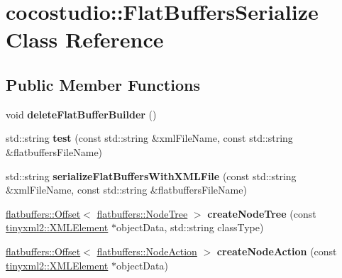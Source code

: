 \hypertarget{classcocostudio_1_1FlatBuffersSerialize}{}\section{cocostudio\+:\+:Flat\+Buffers\+Serialize Class Reference}
\label{classcocostudio_1_1FlatBuffersSerialize}
\subsection*{Public Member Functions}
\begin{DoxyCompactItemize}
\item 
\mbox{\label{classcocostudio_1_1FlatBuffersSerialize_aa6bc2091bd7c2b5c388d763331cca338}} 
void {\bfseries delete\+Flat\+Buffer\+Builder} ()
\item 
\mbox{\label{classcocostudio_1_1FlatBuffersSerialize_a3b3746930bbf5a337fa63b878880de56}} 
std\+::string {\bfseries test} (const std\+::string \&xml\+File\+Name, const std\+::string \&flatbuffers\+File\+Name)
\item 
\mbox{\label{classcocostudio_1_1FlatBuffersSerialize_ae10fbe2e93c37aa80f399138ccf39b63}} 
std\+::string {\bfseries serialize\+Flat\+Buffers\+With\+X\+M\+L\+File} (const std\+::string \&xml\+File\+Name, const std\+::string \&flatbuffers\+File\+Name)
\item 
\mbox{\label{classcocostudio_1_1FlatBuffersSerialize_a5e124cf0abf739ef5829840ef7072893}} 
\hyperlink{structflatbuffers_1_1Offset}{flatbuffers\+::\+Offset}$<$ \hyperlink{structflatbuffers_1_1NodeTree}{flatbuffers\+::\+Node\+Tree} $>$ {\bfseries create\+Node\+Tree} (const \hyperlink{classtinyxml2_1_1XMLElement}{tinyxml2\+::\+X\+M\+L\+Element} $\ast$object\+Data, std\+::string class\+Type)
\item 
\mbox{\label{classcocostudio_1_1FlatBuffersSerialize_a2bbfc857b94aae40a3e504823e7f4580}} 
\hyperlink{structflatbuffers_1_1Offset}{flatbuffers\+::\+Offset}$<$ \hyperlink{structflatbuffers_1_1NodeAction}{flatbuffers\+::\+Node\+Action} $>$ {\bfseries create\+Node\+Action} (const \hyperlink{classtinyxml2_1_1XMLElement}{tinyxml2\+::\+X\+M\+L\+Element} $\ast$object\+Data)

\end{DoxyCompactItemize}
